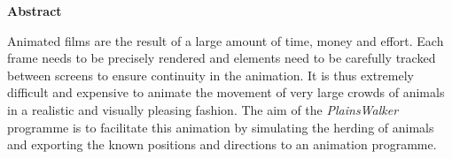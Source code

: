\begin{center}
\Large \bf Abstract
\end{center}

Animated films are the result of a large amount of time, money and effort. Each frame needs to be precisely rendered and elements need to be carefully tracked between screens to ensure continuity in the animation. It is thus extremely difficult and expensive to animate the movement of very large crowds of animals in a realistic and visually pleasing fashion. The aim of the \emph{PlainsWalker} programme is to facilitate this animation by simulating the herding of animals and exporting the known positions and directions to an animation programme.